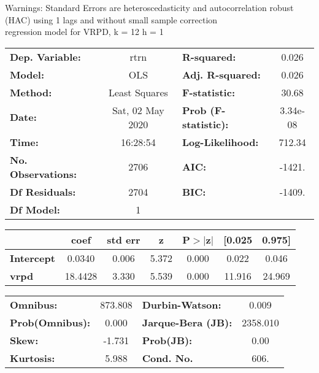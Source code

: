 Warnings: \newline
 [1] Standard Errors are heteroscedasticity and autocorrelation robust (HAC) using 1 lags and without small sample correction\\ 

regression model for VRPD, k = 12 h = 1\begin{center}
\begin{tabular}{lclc}
\toprule
\textbf{Dep. Variable:}    &       rtrn       & \textbf{  R-squared:         } &     0.026   \\
\textbf{Model:}            &       OLS        & \textbf{  Adj. R-squared:    } &     0.026   \\
\textbf{Method:}           &  Least Squares   & \textbf{  F-statistic:       } &     30.68   \\
\textbf{Date:}             & Sat, 02 May 2020 & \textbf{  Prob (F-statistic):} &  3.34e-08   \\
\textbf{Time:}             &     16:28:54     & \textbf{  Log-Likelihood:    } &    712.34   \\
\textbf{No. Observations:} &        2706      & \textbf{  AIC:               } &    -1421.   \\
\textbf{Df Residuals:}     &        2704      & \textbf{  BIC:               } &    -1409.   \\
\textbf{Df Model:}         &           1      & \textbf{                     } &             \\
\bottomrule
\end{tabular}
\begin{tabular}{lcccccc}
                   & \textbf{coef} & \textbf{std err} & \textbf{z} & \textbf{P$> |$z$|$} & \textbf{[0.025} & \textbf{0.975]}  \\
\midrule
\textbf{Intercept} &       0.0340  &        0.006     &     5.372  &         0.000        &        0.022    &        0.046     \\
\textbf{vrpd}      &      18.4428  &        3.330     &     5.539  &         0.000        &       11.916    &       24.969     \\
\bottomrule
\end{tabular}
\begin{tabular}{lclc}
\textbf{Omnibus:}       & 873.808 & \textbf{  Durbin-Watson:     } &    0.009  \\
\textbf{Prob(Omnibus):} &   0.000 & \textbf{  Jarque-Bera (JB):  } & 2358.010  \\
\textbf{Skew:}          &  -1.731 & \textbf{  Prob(JB):          } &     0.00  \\
\textbf{Kurtosis:}      &   5.988 & \textbf{  Cond. No.          } &     606.  \\
\bottomrule
\end{tabular}
\end{center}

